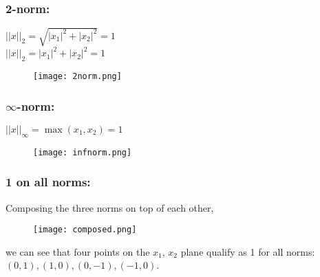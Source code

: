 \documentclass{article}
\begin{document}
\subsubsection*{2-norm:}
$||x||_2=\sqrt{|x_1|^2+|x_2|^2}=1$\\ 
$||x||_2=|x_1|^2+|x_2|^2=1$
\begin{figure}[htp]
    \texttt{[image: 2norm.png]}
\end{figure}
\subsubsection*{$\infty$-norm:}
$||x||_\infty=\max{(x_1,x_2)}=1$
\begin{figure}[htp]
    \texttt{[image: infnorm.png]}
\end{figure}
\pagebreak
\subsubsection*{1 on all norms:}
Composing the three norms on top of each other,

\begin{figure}[htp]
    \texttt{[image: composed.png]}
\end{figure}
we can see that four points on the $x_1$, $x_2$ plane qualify as 1 for all norms: $(0,1),(1,0),(0,-1),(-1,0)$.
\end{document}
